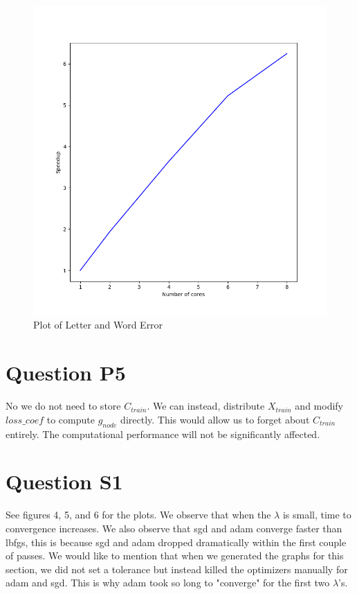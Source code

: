 \documentclass[11pt]{report}
\begin{document}
\begin{figure}[b]
\centering
\includegraphics[scale=0.4]{p4_figure.png}
\caption{Plot of Letter and Word Error}
\end{figure}

\section*{Question P5}
No we do not need to store $C_{train}$. We can instead, distribute $X_{train}$
and modify $loss\_coef$ to compute $g_{node}$ directly. This would allow us to
forget about $C_{train}$ entirely. The computational performance will not be 
significantly affected.

\section*{Question S1}
See figures 4, 5, and 6 for the plots. We observe that when the $\lambda$ is 
small, time to convergence increases. We also observe that sgd and adam converge
faster than lbfgs, this is because sgd and adam dropped dramatically within
the first couple of passes. We would like to mention that when we generated the
graphs for this section, we did not set a tolerance but instead killed the optimizers
manually for adam and sgd. This is why adam took so long to "converge" for the 
first two $\lambda$'s.
\end{document}
